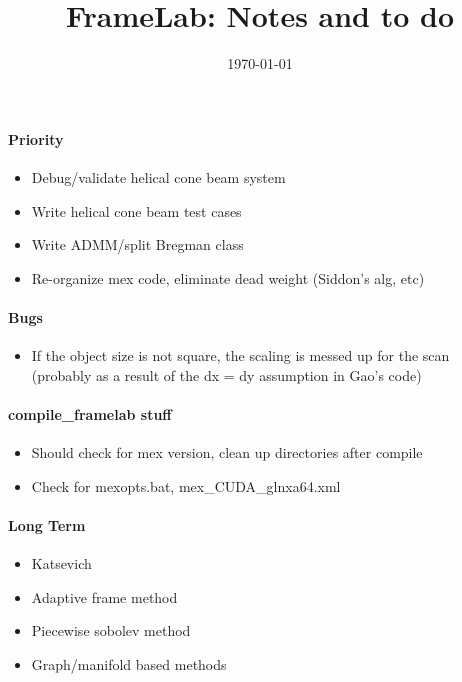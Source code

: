 \documentclass[12pt]{article}
\title{FrameLab: Notes and to do}
\date{\today}
\begin{document}
\maketitle


\paragraph{Priority}
\begin{itemize}
\item Debug/validate helical cone beam system 
\item Write helical cone beam test cases
\item Write ADMM/split Bregman class
\item Re-organize mex code, eliminate dead weight (Siddon's alg, etc)
\end{itemize}

\paragraph{Bugs}
\begin{itemize}
\item If the object size is not square, the scaling is messed up for the scan (probably as a result of the dx = dy assumption in Gao's code)
\end{itemize}

\paragraph{compile\_framelab stuff}
\begin{itemize}
\item Should check for mex version, clean up directories after compile
\item Check for mexopts.bat, mex\_CUDA\_glnxa64.xml
\end{itemize}


\paragraph{Long Term}
\begin{itemize}
\item Katsevich
\item Adaptive frame method
\item Piecewise sobolev method 
\item Graph/manifold based methods 
\end{itemize}



\end{document}
